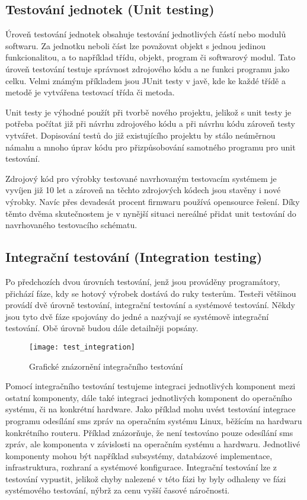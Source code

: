 \subsection{Testování jednotek (Unit testing)}
Úroveň testování jednotek obsahuje testování jednotlivých částí nebo modulů softwaru. Za jednotku neboli část lze považovat objekt s jednou jedinou funkcionalitou, a to například třídu, objekt, program či softwarový modul. Tato úroveň testování testuje správnost zdrojového kódu a ne funkci programu jako celku. Velmi známým příkladem jsou JUnit testy v javě, kde ke každé třídě a metodě je vytvářena testovací třída či metoda.

Unit testy je výhodné použít při tvorbě nového projektu, jelikož s unit testy je potřeba počítat již při návrhu zdrojového kódu a při návrhu kódu zároveň testy vytvářet. Dopisování testů do již existujícího projektu by stálo neúměrnou námahu a mnoho úprav kódu pro přizpůsobování samotného programu pro unit testování.

Zdrojový kód pro výrobky testované navrhovaným testovacím systémem je vyvíjen již 10 let a zároveň na těchto zdrojových kódech jsou stavěny i nové výrobky. Navíc přes devadesát procent firmwaru používá opensource řešení. Díky těmto dvěma skutečnostem je v nynější situaci nereálné přidat unit testování do navrhovaného testovacího schématu.

\subsection{Integrační testování (Integration testing)}
Po předchozích dvou úrovních testování, jenž jsou prováděny programátory, přichází fáze, kdy se hotový výrobek dostává do ruky testerům. Testeři většinou provádí dvě úrovně testování, integrační testování a systémové testování. Někdy jsou tyto dvě fáze spojovány do jedné a nazývají se systémově integrační testování. Obě úrovně budou dále detailněji popsány.

\begin{figure}[h]
  \centering
  \texttt{[image: test\_integration]}
  \caption{Grafické znázornění integračního testování}
  \label{fig:test_integration}
\end{figure}

Pomocí integračního testování testujeme integraci jednotlivých komponent mezi ostatní komponenty, dále také integraci jednotlivých komponent do operačního systému, či na konkrétní hardware. Jako příklad mohu uvést testování integrace programu odesílání sms zpráv na operačním systému Linux, běžícím na hardwaru konkrétního routeru. Příklad znázorňuje, že není testováno pouze odesílání sms zpráv, ale komponenta v závislosti na operačním systému a hardwaru. Jednotlivé komponenty mohou být například subsystémy, databázové implementace, infrastruktura, rozhraní a systémové konfigurace. Integrační testování lze z testování vypustit, jelikož chyby nalezené v této fázi by byly odhaleny ve fázi systémového testování, nýbrž za cenu vyšší časové náročnosti.

